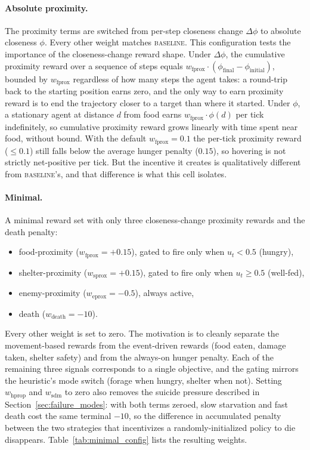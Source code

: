 \documentclass[12pt,a4paper,titlepage]{article}
\begin{document}
\paragraph{Absolute proximity.} The proximity terms are switched from per-step closeness change $\Delta\phi$ to absolute closeness $\phi$. Every other weight matches \textsc{baseline}. This configuration tests the importance of the closeness-change reward shape. Under $\Delta\phi$, the cumulative proximity reward over a sequence of steps equals $w_\text{fprox} \cdot (\phi_\text{final} - \phi_\text{initial})$, bounded by $w_\text{fprox}$ regardless of how many steps the agent takes: a round-trip back to the starting position earns zero, and the only way to earn proximity reward is to end the trajectory closer to a target than where it started. Under $\phi$, a stationary agent at distance $d$ from food earns $w_\text{fprox} \cdot \phi(d)$ per tick indefinitely, so cumulative proximity reward grows linearly with time spent near food, without bound. With the default $w_\text{fprox} = 0.1$ the per-tick proximity reward ($\leq 0.1$) still falls below the average hunger penalty ($0.15$), so hovering is not strictly net-positive per tick. But the incentive it creates is qualitatively different from \textsc{baseline}'s, and that difference is what this cell isolates.

\paragraph{Minimal.} A minimal reward set with only three closeness-change proximity rewards and the death penalty:
\begin{itemize}[nosep,leftmargin=1.6em]
  \item food-proximity ($w_\text{fprox}=+0.15$), gated to fire only when $u_t < 0.5$ (hungry),
  \item shelter-proximity ($w_\text{sprox}=+0.15$), gated to fire only when $u_t \geq 0.5$ (well-fed),
  \item enemy-proximity ($w_\text{eprox}=-0.5$), always active,
  \item death ($w_\text{death}=-10$).
\end{itemize}
Every other weight is set to zero. The motivation is to cleanly separate the movement-based rewards from the event-driven rewards (food eaten, damage taken, shelter safety) and from the always-on hunger penalty. Each of the remaining three signals corresponds to a single objective, and the gating mirrors the heuristic's mode switch (forage when hungry, shelter when not). Setting $w_\text{hprop}$ and $w_\text{sdm}$ to zero also removes the suicide pressure described in Section~\ref{sec:failure_modes}: with both terms zeroed, slow starvation and fast death cost the same terminal $-10$, so the difference in accumulated penalty between the two strategies that incentivizes a randomly-initialized policy to die disappears. Table~\ref{tab:minimal_config} lists the resulting weights.
\end{document}
